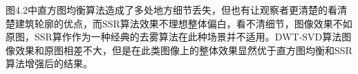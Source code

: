图4.2中直方图均衡算法造成了多处地方细节丢失，但也有让观察者更清楚的看清楚建筑轮廓的优点，而SSR算法效果不理想整体偏白，看不清细节，图像效果不如原图，SSR算作作为一种经典的去雾算法在此种场景并不适用。DWT-SVD算法图像效果和原图相差不大，但是在此类图像上的整体效果显然优于直方图均衡和SSR算法增强后的结果。

\begin{table}[t!]
    \label{tab:sample}
    \centering
    \footnotesize%
    \setlength{\tabcolsep}{4pt}%
    \renewcommand{\arraystretch}{1.2}%
    
\end{table}



